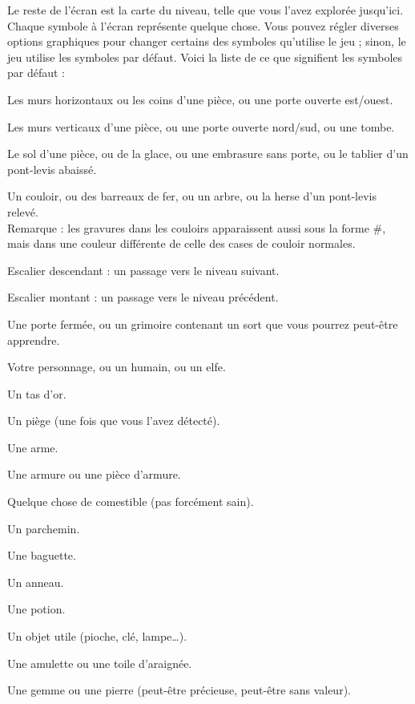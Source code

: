 \documentclass[titlepage]{article}
\begin{document}
Le reste de l'écran est la carte du niveau, telle que vous l'avez explorée
jusqu'ici.  Chaque symbole à l'écran représente quelque chose.  Vous pouvez régler
diverses options graphiques
pour changer certains des symboles qu'utilise le jeu ; sinon, le
jeu utilise les symboles par défaut.  Voici la liste de ce que signifient
les symboles par défaut :

\begin{description}[font=\mdseries\ttfamily]
\item[-]
Les murs horizontaux ou les coins d'une pièce, ou une porte ouverte est/ouest.
\item[|]
Les murs verticaux d'une pièce, ou une porte ouverte nord/sud, ou une tombe.
\item[.]
Le sol d'une pièce, ou de la glace, ou une embrasure sans porte, ou le tablier
d'un pont-levis abaissé.
\item[\#]
Un couloir, ou des barreaux de fer, ou un arbre, ou la herse d'un pont-levis
relevé.\\
Remarque : les gravures dans les couloirs apparaissent aussi sous la forme \#, mais
dans une couleur différente de celle des cases de couloir normales.
\item[>]
Escalier descendant : un passage vers le niveau suivant.
\item[<]
Escalier montant : un passage vers le niveau précédent.
\item[+]
Une porte fermée, ou un grimoire contenant un sort que vous pourrez peut-être apprendre.
\item[@]
Votre personnage, ou un humain, ou un elfe.
\item[\textdollar]
Un tas d'or.
\item[\textasciicircum]
Un piège (une fois que vous l'avez détecté).
\item[)]
Une arme.
\item[{[}]
Une armure ou une pièce d'armure.
\item[\%]
Quelque chose de comestible (pas forcément sain).
\item[?]
Un parchemin.
\item[/]
Une baguette.
\item[=]
Un anneau.
\item[!]
Une potion.
\item[(]
Un objet utile (pioche, clé, lampe\ldots).
\item["]
Une amulette ou une toile d'araignée.
\item[*]
Une gemme ou une pierre (peut-être précieuse, peut-être sans valeur).

\end{description}
\end{document}
